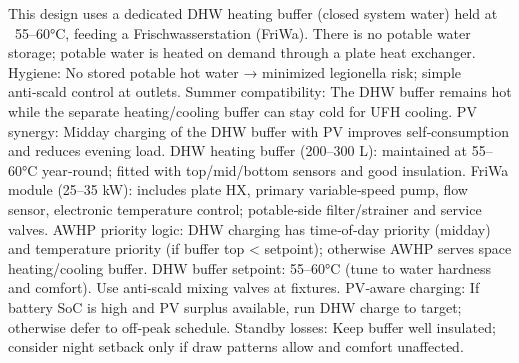 \markdownRendererDocumentBegin
\markdownRendererSectionBegin
{}\markdownRendererInterblockSeparator
{}This design uses a dedicated DHW heating buffer (closed system water) held at ~55–60°C, feeding a Frischwasserstation (FriWa). There is no potable water storage; potable water is heated on demand through a plate heat exchanger.\markdownRendererInterblockSeparator
{}\markdownRendererSectionBegin
{}\markdownRendererInterblockSeparator
{}\markdownRendererUlBeginTight
\markdownRendererUlItem Hygiene: No stored potable hot water → minimized legionella risk; simple anti‑scald control at outlets.\markdownRendererUlItemEnd 
\markdownRendererUlItem Summer compatibility: The DHW buffer remains hot while the separate heating/cooling buffer can stay cold for UFH cooling.\markdownRendererUlItemEnd 
\markdownRendererUlItem PV synergy: Midday charging of the DHW buffer with PV improves self‑consumption and reduces evening load.\markdownRendererUlItemEnd 
\markdownRendererUlEndTight \markdownRendererInterblockSeparator
{}
\markdownRendererSectionEnd \markdownRendererSectionBegin
{}\markdownRendererInterblockSeparator
{}\markdownRendererUlBeginTight
\markdownRendererUlItem DHW heating buffer (200–300 L): maintained at 55–60°C year‑round; fitted with top/mid/bottom sensors and good insulation.\markdownRendererUlItemEnd 
\markdownRendererUlItem FriWa module (25–35 kW): includes plate HX, primary variable‑speed pump, flow sensor, electronic temperature control; potable‑side filter/strainer and service valves.\markdownRendererUlItemEnd 
\markdownRendererUlItem AWHP priority logic: DHW charging has time‑of‑day priority (midday) and temperature priority (if buffer top < setpoint); otherwise AWHP serves space heating/cooling buffer.\markdownRendererUlItemEnd 
\markdownRendererUlEndTight \markdownRendererInterblockSeparator
{}
\markdownRendererSectionEnd \markdownRendererSectionBegin
{}\markdownRendererInterblockSeparator
{}\markdownRendererUlBeginTight
\markdownRendererUlItem DHW buffer setpoint: 55–60°C (tune to water hardness and comfort). Use anti‑scald mixing valves at fixtures.\markdownRendererUlItemEnd 
\markdownRendererUlItem PV‑aware charging: If battery SoC is high and PV surplus available, run DHW charge to target; otherwise defer to off‑peak schedule.\markdownRendererUlItemEnd 
\markdownRendererUlItem Standby losses: Keep buffer well insulated; consider night setback only if draw patterns allow and comfort unaffected.\markdownRendererUlItemEnd 
